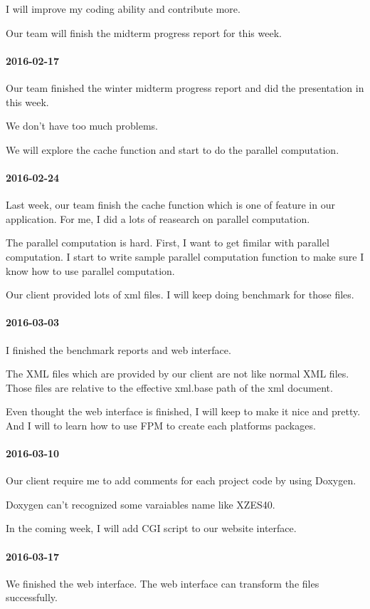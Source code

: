 I will improve my coding ability and contribute more.

Our team will finish the midterm progress report for this week.
\paragraph{2016-02-17}
Our team finished the winter midterm progress report and did the presentation in this week.

We don't have too much problems.

We will explore the cache function and start to do the parallel computation.
\paragraph{2016-02-24}
Last week, our team finish the cache function which is one of feature in our application. For me, I did a lots of reasearch on parallel computation.

The parallel computation is hard. First, I want to get fimilar with parallel computation. I start to write sample parallel computation function to make sure I know how to use parallel computation.

Our client provided lots of xml files. I will keep doing benchmark for those files.
\paragraph{2016-03-03}
I finished the benchmark reports and web interface.

The XML files which are provided by our client are not like normal XML files. Those files are relative to the effective xml.base path of the xml document.

Even thought the web interface is finished, I will keep to make it nice and pretty. And I will to learn how to use FPM to create each platforms packages.
\paragraph{2016-03-10}
Our client require me to add comments for each project code by using Doxygen.

Doxygen can't recognized some varaiables name like XZES40.

In the coming week, I will add CGI script to our website interface.
\paragraph{2016-03-17}
We finished the web interface. The web interface can transform the files successfully.

